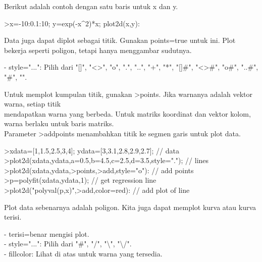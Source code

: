 \documentclass[a4paper,10pt]{article}
\begin{document}
\begin{eulernotebook}
\begin{eulercomment}
\begin{eulercomment}
\begin{eulercomment}
\begin{eulercomment}
\begin{eulercomment}
\begin{eulercomment}
\begin{eulercomment}
\begin{eulercomment}
\begin{eulercomment}
\begin{eulercomment}
\begin{eulercomment}
\begin{eulercomment}
\begin{eulercomment}
Berikut adalah contoh dengan satu baris untuk x dan y.
\end{eulercomment}
\begin{eulerprompt}
>x=-10:0.1:10; y=exp(-x^2)*x; plot2d(x,y):
\end{eulerprompt}
\begin{eulerudf}
  
\end{eulerudf}
\begin{eulercomment}
Data juga dapat diplot sebagai titik. Gunakan points=true untuk ini.
Plot bekerja seperti poligon, tetapi hanya menggambar sudutnya.

- style="...": Pilih dari "[]", "\textless{}\textgreater{}", "o", ".", "..", "+", "*", "[]#",
"\textless{}\textgreater{}#", "o#", "..#", "#", "\textbar{}".

Untuk memplot kumpulan titik, gunakan \textgreater{}points. Jika warnanya adalah
vektor warna, setiap titik\\
mendapatkan warna yang berbeda. Untuk matriks koordinat dan vektor
kolom, warna berlaku untuk baris matriks.\\
Parameter \textgreater{}addpoints menambahkan titik ke segmen garis untuk plot
data.
\end{eulercomment}
\begin{eulerprompt}
>xdata=[1,1.5,2.5,3,4]; ydata=[3,3.1,2.8,2.9,2.7]; // data
>plot2d(xdata,ydata,a=0.5,b=4.5,c=2.5,d=3.5,style="."); // lines
>plot2d(xdata,ydata,>points,>add,style="o"): // add points
>p=polyfit(xdata,ydata,1); // get regression line
>plot2d("polyval(p,x)",>add,color=red): // add plot of line
\end{eulerprompt}
\begin{eulercomment}
Plot data sebenarnya adalah poligon. Kita juga dapat memplot kurva
atau kurva terisi.

- terisi=benar mengisi plot.\\
- style="...": Pilih dari "#", "/", "\textbackslash{}", "\textbackslash{}/".\\
- fillcolor: Lihat di atas untuk warna yang tersedia.


\end{eulercomment}
\end{eulercomment}
\end{eulercomment}
\end{eulercomment}
\end{eulercomment}
\end{eulercomment}
\end{eulercomment}
\end{eulercomment}
\end{eulercomment}
\end{eulercomment}
\end{eulercomment}
\end{eulercomment}
\end{eulercomment}
\end{eulernotebook}
\end{document}
